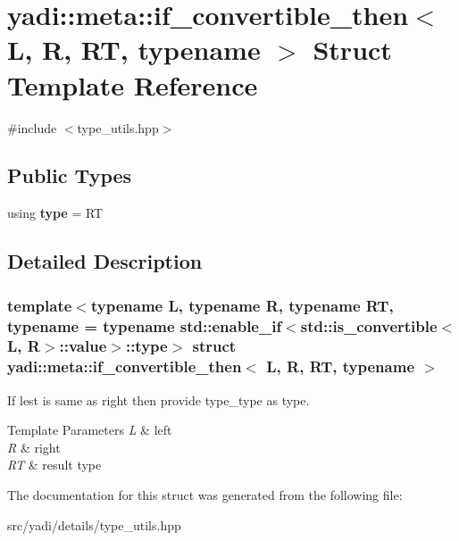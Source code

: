 \hypertarget{structyadi_1_1meta_1_1if__convertible__then}{}\section{yadi\+:\+:meta\+:\+:if\+\_\+convertible\+\_\+then$<$ L, R, RT, typename $>$ Struct Template Reference}
\label{structyadi_1_1meta_1_1if__convertible__then}


{\ttfamily \#include $<$type\+\_\+utils.\+hpp$>$}

\subsection*{Public Types}
\begin{DoxyCompactItemize}
\item 
\mbox{\label{structyadi_1_1meta_1_1if__convertible__then_af5f58c3e86c8f9a05a918090e86d618f}} 
using {\bfseries type} = RT
\end{DoxyCompactItemize}


\subsection{Detailed Description}
\subsubsection*{template$<$typename L, typename R, typename RT, typename = typename std\+::enable\+\_\+if$<$std\+::is\+\_\+convertible$<$\+L, R$>$\+::value$>$\+::type$>$\newline
struct yadi\+::meta\+::if\+\_\+convertible\+\_\+then$<$ L, R, R\+T, typename $>$}

If lest is same as right then provide type\+\_\+type as type. 
\begin{DoxyTemplParams}{Template Parameters}
{\em L} & left \\
\hline
{\em R} & right \\
\hline
{\em RT} & result type \\
\hline
\end{DoxyTemplParams}


The documentation for this struct was generated from the following file\+:\begin{DoxyCompactItemize}
\item 
src/yadi/details/type\+\_\+utils.\+hpp\end{DoxyCompactItemize}
